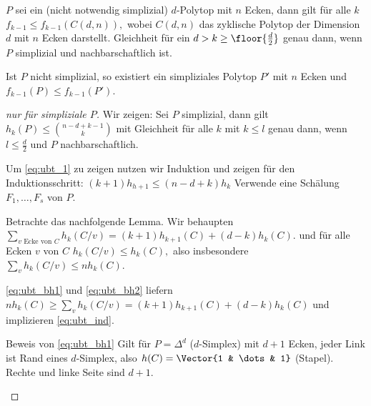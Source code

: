 \begin{thm}
    $P$ sei ein (nicht notwendig simplizial) $d$-Polytop mit $n$ Ecken, dann gilt für alle $k$
    \begin{math}
        f_{k-1} \le f_{k-1}(C(d,n)),
    \end{math}
    wobei $C(d,n)$ das zyklische Polytop der Dimension $d$ mit $n$ Ecken darstellt.
    Gleichheit für ein $d > k \ge \floor{\frac{d}{2}}$ genau dann, wenn $P$ simplizial und nachbarschaftlich ist.

    \begin{note}
        Ist $P$ nicht simplizial, so existiert ein simpliziales Polytop $P'$ mit $n$ Ecken und $f_{k-1}(P) \le f_{k-1}(P')$.
    \end{note}
    \begin{proof}[nur für simpliziale $P$]
        Wir zeigen: Sei $P$ simplizial, dann gilt
        \begin{math} \label{eq:ubt_1}
            h_k(P) \le \binom{n-d+k-1}{k}
        \end{math}
        mit Gleichheit für alle $k$ mit $k \le l$ genau dann, wenn $l \le \frac{d}{2}$ und $P$ nachbarschaftlich.

        Um \eqref{eq:ubt_1} zu zeigen nutzen wir Induktion und zeigen für den Induktionsschritt:
        \begin{math} \label{eq:ubt_ind}
            (k+1) h_{h+1} \le (n-d+k) h_k
        \end{math}
        Verwende eine Schälung $F_1, \dotsc, F_s$ von $P$.

        Betrachte das nachfolgende Lemma.
        Wir behaupten
        \begin{math}[numbered=multiple] \label{eq:ubt_bh1}
            \sum_{\text{$v$ Ecke von $C$}} h_k(C / v) = (k+1) h_{k+1}(C) + (d-k) h_k(C). \tag{B1}
        \end{math}
        und für alle Ecken $v$ von $C$
        \begin{math}[numbered=multiple] \label{eq:ubt_bh2}
            h_k(C/v) \le h_k(C), \tag{B2}
        \end{math}
        also insbesondere $\sum_{v} h_k(C/v) \le n h_k(C)$.

        \eqref{eq:ubt_bh1} und \eqref{eq:ubt_bh2} liefern
        \begin{math}
            n h_k(C)
            \ge \sum_{v} h_k(C/v)
            = (k+1) h_{k+1}(C) + (d-k) h_k(C)
        \end{math}
        und implizieren \eqref{eq:ubt_ind}.
        \begin{seg}{Beweis von \eqref{eq:ubt_bh1}}
            Gilt für $P = \Delta^d$ ($d$-Simplex) mit $d+1$ Ecken, jeder Link ist Rand eines $d$-Simplex, also $h(C) = \Vector{1 & \dots & 1}$ (Stapel).
            Rechte und linke Seite sind $d+1$.


\end{seg}
\end{proof}
\end{thm}
